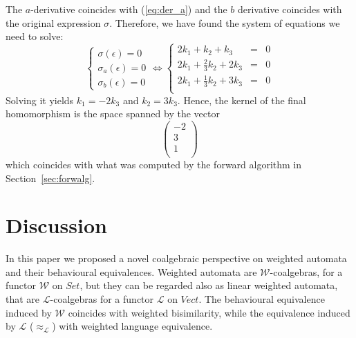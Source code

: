 \documentclass[3p]{elsarticle}
\newcommand{\fW}{\mathcal{W}}    %
\newcommand{\fL}{\mathcal{L}}    %
\newcommand{\beh}[3]{\left[\!\left[ #1 \right]\!\right]^{#2}_{#3}} %
\begin{document}
The $a$-derivative coincides with (\ref{eq:der_a}) and the $b$
derivative coincides with the original expression $\sigma$. Therefore, we have
found the system of equations we need to solve:
\[
\left\{\begin{array}{l}
\sigma(\epsilon) = 0 \\
\sigma_a(\epsilon) = 0\\
\sigma_b(\epsilon) = 0
\end{array}\right . \Leftrightarrow
\left\{\begin{array}{lcl}
2k_1 + k_2 + k_3 &=& 0\\
2k_1 + \frac 2 3 k_2 + 2k_3 &=&0 \\
2k_1 +
\frac 1 3 k_2+ 3k_3 &=& 0 \\
\end{array}\right .
\]
Solving it yields $k_1 = -2k_3$ and $k_2 = 3k_3$. Hence, the kernel
of the final homomorphism is the space spanned by the vector
$$\left(%
\begin{array}{c}
  -2 \\
  3\\
  1\\
\end{array}\right)$$ which coincides with what was
computed by the forward algorithm in Section~\ref{sec:forwalg}.



\section{Discussion}\label{sec:discussion}

In this paper we proposed a novel coalgebraic perspective on weighted automata and their behavioural equivalences.
Weighted automata are $\fW$-coalgebras, for a functor $\fW$ on $Set$, but
they can be regarded also as linear weighted automata, that are $\fL$-coalgebras for a functor $\fL$ on $Vect$.
The behavioural equivalence induced by $\fW$ coincides with weighted bisimilarity, while the equivalence
induced by $\fL$ ($\approx_{\fL}$) with weighted language equivalence.
\end{document}
